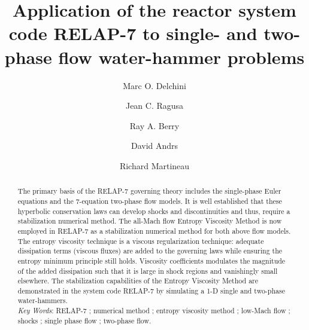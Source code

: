 \documentclass{mc2015}
\begin{document}
\title{Application of the reactor system code RELAP-7 to single- and two-phase flow water-hammer problems}

\author{Marc O. Delchini}
\author{Jean C. Ragusa}

\author{Ray A. Berry}
\author{David Andrs}
\author{Richard Martineau}

\maketitle

\begin{abstract}
The primary basis of the RELAP-7 \cite{Berry_Peterson_2014} governing theory includes the single-phase Euler equations and the 7-equation two-phase flow models. 
It is well established that these hyperbolic conservation laws can develop shocks and discontinuities and thus, require a stabilization 
numerical method. The all-Mach flow Entropy Viscosity Method is now employed in RELAP-7 as a stabilization numerical method for both 
above flow models. The entropy viscosity technique is a viscous regularization technique: adequate dissipation terms (viscous fluxes) are 
added to the governing laws while ensuring the entropy minimum principle still holds. Viscosity coefficients modulates the magnitude of the 
added dissipation such that it is large in shock regions and vanishingly small elsewhere. The stabilization capabilities of the Entropy Viscosity 
Method are demonstrated in the system code RELAP-7 by simulating a 1-D single and two-phase water-hammers. \\
%
\emph{Key Words}:  RELAP-7 ; numerical method ; entropy viscosity method ; low-Mach flow ; shocks ; single phase flow ; two-phase flow.
\end{abstract}

\end{document}
